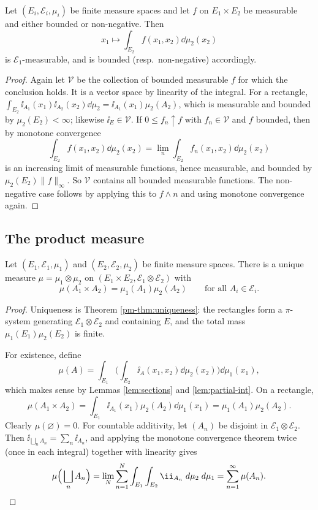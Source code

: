 \documentclass[a4paper]{scrartcl}
\newcommand{\cE}{\mathcal{E}}
\newcommand{\cV}{\mathcal{V}}
\newcommand{\ind}{\ii}
\begin{document}
\begin{lemma}\label{lem:partial-int}
	Let $(E_i,\cE_i,\mu_i)$ be finite measure spaces and let $f$ on $E_1\times E_2$ be measurable and either bounded or non-negative. Then
	$$
	x_1 \longmapsto \int_{E_2} f(x_1,x_2)\dd\mu_2(x_2)
	$$
	is $\cE_1$-measurable, and is bounded (resp.\ non-negative) accordingly.
\end{lemma}
\begin{proof}
	Again let $\cV$ be the collection of bounded measurable $f$ for which the conclusion holds. It is a vector space by linearity of the integral. For a rectangle, $\int_{E_2}\ind_{A_1}(x_1)\ind_{A_2}(x_2)\dd\mu_2 = \ind_{A_1}(x_1)\mu_2(A_2)$, which is measurable and bounded by $\mu_2(E_2)<\infty$; likewise $\ind_E \in \cV$. If $0 \leq f_n \uparrow f$ with $f_n \in \cV$ and $f$ bounded, then by monotone convergence
	$$
	\int_{E_2} f(x_1,x_2)\dd\mu_2(x_2) = \lim_n \int_{E_2} f_n(x_1,x_2)\dd\mu_2(x_2)
	$$
	is an increasing limit of measurable functions, hence measurable, and bounded by $\mu_2(E_2)\|f\|_\infty$. So $\cV$ contains all bounded measurable functions. The non-negative case follows by applying this to $f \wedge n$ and using monotone convergence again.
\end{proof}

\subsection{The product measure}

\begin{theorem}\label{thm:product}
	Let $(E_1,\cE_1,\mu_1)$ and $(E_2,\cE_2,\mu_2)$ be finite measure spaces. There is a unique measure $\mu = \mu_1\otimes\mu_2$ on $(E_1\times E_2, \cE_1\otimes\cE_2)$ with
	$$
	\mu(A_1\times A_2) = \mu_1(A_1)\mu_2(A_2) \qquad \text{for all } A_i \in \cE_i.
	$$
\end{theorem}
\begin{proof}
	Uniqueness is Theorem \ref{pm-thm:uniqueness}: the rectangles form a $\pi$-system generating $\cE_1\otimes\cE_2$ and containing $E$, and the total mass $\mu_1(E_1)\mu_2(E_2)$ is finite.

	For existence, define
	$$
	\mu(A) = \int_{E_1}\Big( \int_{E_2}\ind_A(x_1,x_2)\dd\mu_2(x_2)\Big)\dd\mu_1(x_1),
	$$
	which makes sense by Lemmas \ref{lem:sections} and \ref{lem:partial-int}. On a rectangle,
	$$
	\mu(A_1\times A_2) = \int_{E_1}\ind_{A_1}(x_1)\mu_2(A_2)\dd\mu_1(x_1) = \mu_1(A_1)\mu_2(A_2).
	$$
	Clearly $\mu(\varnothing) = 0$. For countable additivity, let $(A_n)$ be disjoint in $\cE_1\otimes\cE_2$. Then $\ind_{\bigsqcup_n A_n} = \sum_n \ind_{A_n}$, and applying the monotone convergence theorem twice (once in each integral) together with linearity gives
	$$
	\mu\Big(\bigsqcup_n A_n\Big) = \lim_{N}\sum_{n=1}^N \int_{E_1}\int_{E_2}\ind_{A_n}\dd\mu_2\dd\mu_1 = \sum_{n=1}^\infty \mu(A_n). \qedhere
	$$
\end{proof}
\end{document}
